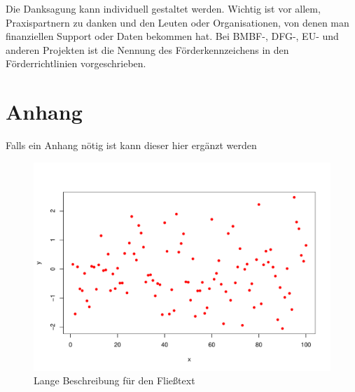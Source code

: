 \documentclass[english,ngerman,BCOR=6mm,cdgeometry=no,parskip=half,DIV=13]{tudscrreprt}
\begin{document}
Die Danksagung kann individuell gestaltet werden. Wichtig ist vor allem,
Praxispartnern zu danken und den Leuten oder Organisationen, von denen man
finanziellen Support oder Daten bekommen hat. Bei BMBF-, DFG-, EU- und anderen
Projekten ist die Nennung des Förderkennzeichens in den Förderrichtlinien
vorgeschrieben.


\printbibliography



\setcounter{chapter}{0}
\renewcommand\thechapter{\Alph{chapter}}
\chapter{Anhang}

Falls ein Anhang nötig ist kann dieser hier ergänzt werden

\begin{figure}[h]
	\includegraphics[width=\linewidth]{pdf-plot.pdf}
	\caption[kurze Beschreibung für die Liste der Abbildungen]{Lange Beschreibung für den Fließtext}
\end{figure}
\end{document}
